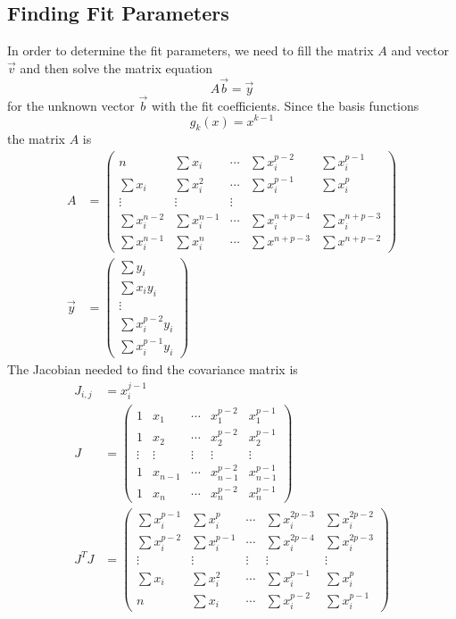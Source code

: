 \documentclass{scrartcl}
\begin{document}
\subsection{Finding Fit Parameters}
In order to determine the fit parameters, we need to fill the
matrix $A$ and vector $\vec{v}$ and then solve the matrix equation
\begin{equation}
A\vec{b}=\vec{y}
\end{equation}
for the unknown vector $\vec{b}$ with the fit coefficients.  Since 
the basis functions
\begin{equation}
g_k(x) = x^{k-1}
\end{equation}
the matrix $A$ is
\begin{align}
A &= \left(\begin{array}{ccccc}
n&\sum x_i&\cdots&\sum x_i^{p-2}& \sum x_i^{p-1}\\
\sum x_i& \sum x_i^2 & \cdots &\sum x_i^{p-1} & \sum x_i^p\\
\vdots&\vdots&\vdots\\
\sum x_i^{n-2}&\sum x_i^{n-1}&\cdots&\sum x_i^{n+p-4}& \sum x_i^{n+p-3}\\
\sum x_i^{n-1}&\sum x_i^n&\cdots&\sum x^{n+p-3}&\sum x^{n+p-2}
\end{array}\right)\\
\vec{y} &= \left(\begin{array}{c}
\sum y_i\\
\sum x_i y_i\\
\vdots\\
\sum x_i^{p-2}y_i\\
\sum x_i^{p-1}y_i
\end{array}\right)
\end{align}
The Jacobian needed to find the covariance matrix is
\begin{align}
J_{i,j} &= x_i^{j-1}\\
J &= \left(\begin{array}{ccccc}
1 & x_1 & \cdots & x_1^{p-2} & x_1^{p-1} \\
1 & x_2 & \cdots & x_2^{p-2} & x_2^{p-1} \\
\vdots & \vdots & \vdots & \vdots & \vdots \\
1 & x_{n-1} & \cdots & x_{n-1}^{p-2} & x_{n-1}^{p-1}\\
1 & x_n & \cdots & x_n^{p-2} & x_n^{p-1}
\end{array}\right)\\
J^{T}J &= \left(\begin{array}{ccccc}
\sum x_i^{p-1} & \sum x_i^p & \cdots & \sum x_i^{2p-3} & \sum x_i^{2p-2}\\
\sum x_i^{p-2} & \sum x_i^{p-1} & \cdots & \sum x_i^{2p-4} & \sum x_i^{2p-3}\\
\vdots & \vdots & \vdots & \vdots & \vdots \\
\sum x_i & \sum x_i^2 & \cdots & \sum x_i^{p-1} & \sum x_i^p \\
n & \sum x_i & \cdots & \sum x_i^{p-2} & \sum x_i^{p-1}
\end{array}\right)
\end{align}
\end{document}

